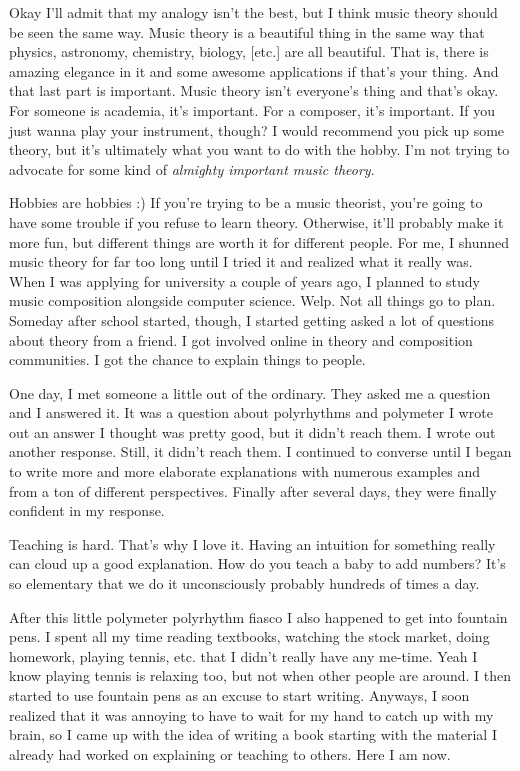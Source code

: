 \documentclass[../OpenAppliedMusicTheory.tex]{subfiles}
\begin{document}
    Okay I'll admit that my analogy isn't the best, but I think music theory should be seen the same way. Music theory is a beautiful thing in the same way that physics, astronomy, chemistry, biology, [etc.] are all beautiful. That is, there is amazing elegance in it and some awesome applications if that's your thing. And that last part is important. Music theory isn't everyone's thing and that's okay. For someone is academia, it's important. For a composer, it's important. If you just wanna play your instrument, though? I would recommend you pick up some theory, but it's ultimately what you want to do with the hobby. I'm not trying to advocate for some kind of \emph{almighty important music theory}.

    Hobbies are hobbies :) If you're trying to be a music theorist, you're going to have some trouble if you refuse to learn theory. Otherwise, it'll probably make it more fun, but different things are worth it for different people. For me, I shunned music theory for far too long until I tried it and realized what it really was. When I was applying for university a couple of years ago, I planned to study music composition alongside computer science. Welp. Not all things go to plan. Someday after school started, though, I started getting asked a lot of questions about theory from a friend. I got involved online in theory and composition communities. I got the chance to explain things to people.

    One day, I met someone a little out of the ordinary. They asked me a question and I answered it. It was a question about polyrhythms and polymeter I wrote out an answer I thought was pretty good, but it didn't reach them. I wrote out another response. Still, it didn't reach them. I continued to converse until I began to write more and more elaborate explanations with numerous examples and from a ton of different perspectives. Finally after several days, they were finally confident in my response. 

    Teaching is hard. That's why I love it. Having an intuition for something really can cloud up a good explanation. How do you teach a baby to add numbers? It's so elementary that we do it unconsciously probably hundreds of times a day. 

    After this little polymeter polyrhythm fiasco I also happened to get into fountain pens. I spent all my time reading textbooks, watching the stock market, doing homework, playing tennis, etc. that I didn't really have any me-time. Yeah I know playing tennis is relaxing too, but not when other people are around. I then started to use fountain pens as an excuse to start writing. Anyways, I soon realized that it was annoying to have to wait for my hand to catch up with my brain, so I came up with the idea of writing a book starting with the material I already had worked on explaining or teaching to others. Here I am now.
\end{document}
